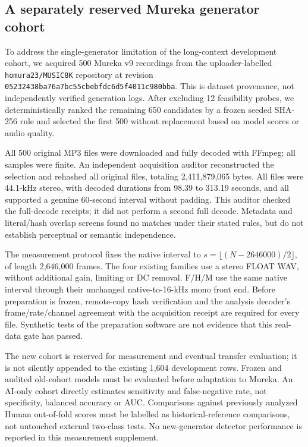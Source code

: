\subsection{A separately reserved Mureka generator cohort}

To address the single-generator limitation of the long-context development
cohort, we acquired 500 Mureka v9 recordings from the uploader-labelled
\texttt{homura23/MUSIC8K} repository at revision
\texttt{05232438ba76a7bc55cbebfdc6d5f4011c980bba}.
This is dataset provenance, not independently verified generation logs.
After excluding 12 feasibility probes, we deterministically ranked the
remaining 650 candidates by a frozen seeded SHA-256 rule and selected the
first 500 without replacement based on model scores or audio quality.

All 500 original MP3 files were downloaded and fully decoded with FFmpeg;
all samples were finite. An independent acquisition auditor reconstructed the
selection and rehashed all original files, totaling 2,411,879,065 bytes. All
files were 44.1-kHz stereo, with decoded durations from 98.39 to 313.19 seconds,
and all supported a genuine 60-second interval without padding. This auditor
checked the full-decode receipts; it did not perform a second full decode.
Metadata and literal/hash overlap screens found no matches under their stated
rules, but do not establish perceptual or semantic independence.

The measurement protocol fixes the native interval to
\(s=\lfloor(N-2646000)/2\rfloor\), of length 2,646,000 frames. The four existing
families use a stereo FLOAT WAV, without additional gain, limiting or DC
removal. F/H/M use the same native interval through their unchanged
native-to-16-kHz mono front end. Before preparation is frozen, remote-copy
hash verification and the analysis decoder's frame/rate/channel agreement
with the acquisition receipt are required for every file. Synthetic tests of
the preparation software are not evidence that this real-data gate has passed.

The new cohort is reserved for measurement and eventual transfer evaluation;
it is not silently appended to the existing 1,604 development rows. Frozen
and audited old-cohort models must be evaluated before adaptation to Mureka.
An AI-only cohort directly estimates sensitivity and false-negative rate,
not specificity, balanced accuracy or AUC. Comparisons against previously
analyzed Human out-of-fold scores must be labelled as historical-reference
comparisons, not untouched external two-class tests. No new-generator
detector performance is reported in this measurement supplement.

